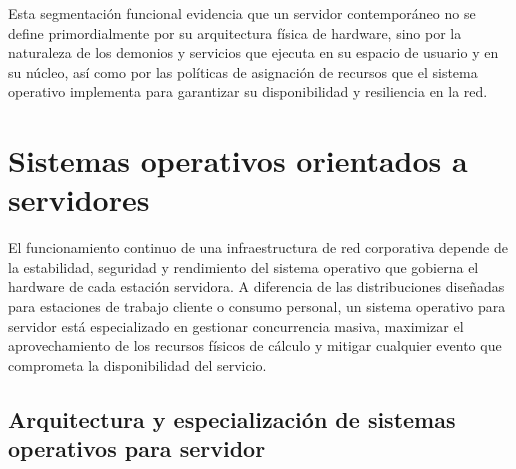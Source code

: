 \documentclass[12pt]{article}
\begin{document}
Esta segmentación funcional evidencia que un servidor contemporáneo no se define primordialmente por su arquitectura física de hardware, sino por la naturaleza de los demonios y servicios que ejecuta en su espacio de usuario y en su núcleo, así como por las políticas de asignación de recursos que el sistema operativo implementa para garantizar su disponibilidad y resiliencia en la red.

\section{Sistemas operativos orientados a servidores}
\label{sec:sistemasOperativosServidores}

El funcionamiento continuo de una infraestructura de red corporativa depende de la estabilidad, seguridad y rendimiento del sistema operativo que gobierna el hardware de cada estación servidora. A diferencia de las distribuciones diseñadas para estaciones de trabajo cliente o consumo personal, un sistema operativo para servidor está especializado en gestionar concurrencia masiva, maximizar el aprovechamiento de los recursos físicos de cálculo y mitigar cualquier evento que comprometa la disponibilidad del servicio.

\subsection{Arquitectura y especialización de sistemas operativos para servidor}
\label{sec:arquitecturaEspecializacionServidores}
\end{document}
